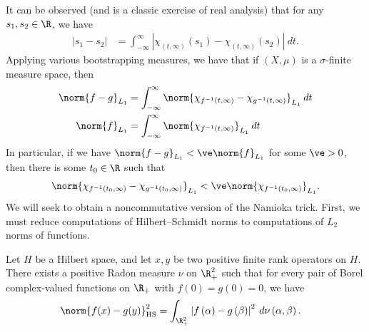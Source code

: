\documentclass[10pt]{mypackage}
\begin{document}
It can be observed (and is a classic exercise of real analysis) that for any $s_1,s_2\in \R$, we have
\begin{align*}
  \left\vert s_1-s_2 \right\vert &= \int_{-\infty}^{\infty} \left\vert \chi_{\left( t,\infty \right)}\left( s_1 \right) - \chi_{\left( t,\infty \right)}\left( s_2 \right) \right\vert\:dt.
\end{align*}
Applying various bootstrapping measures, we have that if $\left( X,\mu \right)$ is a $\sigma$-finite measure space, then
\begin{align*}
  \norm{f-g}_{L_1} &= \int_{-\infty}^{\infty} \norm{ \chi_{f^{-1}\left( t,\infty \right)} - \chi_{g^{-1}\left( t,\infty \right)} }_{L_1}\:dt\\
  \norm{f}_{L_1} &= \int_{-\infty}^{\infty} \norm{\chi_{f^{-1}\left( t,\infty \right)}}_{L_1}\:dt
\end{align*}
In particular, if we have $\norm{f-g}_{L_1} < \ve \norm{f}_{L_1}$ for some $\ve > 0$, then there is some $t_0\in \R$ such that
\begin{align*}
  \norm{\chi_{f^{-1}\left( t_0,\infty \right)} - \chi_{g^{-1}\left( t_0,\infty \right)}}_{L_1} < \ve \norm{\chi_{f^{-1}\left( t_0,\infty \right)}}_{L_1}.
\end{align*}
We will seek to obtain a noncommutative version of the Namioka trick. First, we must reduce computations of Hilbert--Schmidt norms to computations of $L_2$ norms of functions.
\begin{proposition}
  Let $ H $ be a Hilbert space, and let $x,y$ be two positive finite rank operators on $H$. There exists a positive Radon measure $\nu$ on $\R^2_{+}$ such that for every pair of Borel complex-valued functions on $\R_{+}$ with $f(0) = g(0) = 0$, we have
  \begin{align*}
    \norm{f(x)-g(y)}_{\operatorname{HS}}^2 &= \int_{\R^2_{+}}^{} \left\vert f\left( \alpha \right)-g\left( \beta \right) \right\vert^{2}\:d\nu\left( \alpha,\beta \right).
  \end{align*}
\end{proposition}
\end{document}

